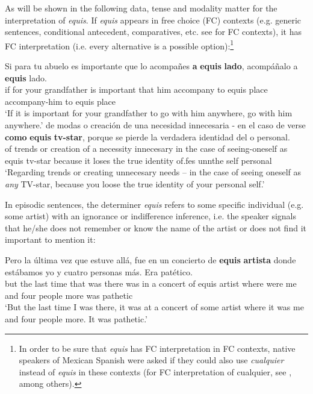 \documentclass[output=paper]{langsci/langscibook}
\begin{document}
As will be shown in the following data, tense and modality matter for the interpretation of \textit{equis}. If \textit{equis} appears in free choice (FC) contexts (e.g. generic sentences, conditional antecedent, comparatives, etc. see \citealt{Aloni2010} for FC contexts), it has FC interpretation (i.e. every alternative is a possible option):\footnote{In order to be sure that \textit{equis} has FC interpretation in FC contexts, native speakers of Mexican Spanish were asked if they could also use \textit{cualquier} instead of \textit{equis} in these contexts (for FC interpretation of cualquier, see \citealt{AM2011}, among others).}

\ea\label{ex:kellert:9}
\gll Si para tu abuelo es importante que lo acompañes \textbf{a} \textbf{equis} \textbf{lado}, acompáñalo a \textbf{equis} lado.\\
if for your grandfather is important that him accompany to equis place accompany-him to equis place\\
\glt ‘If it is important for your grandfather to go with him anywhere, go with him anywhere.’
\ex 
\gll de modas o creación de una necesidad innecesaria - en el caso de verse \textbf{como} \textbf{equis} \textbf{tv-star}, porque se pierde la verdadera identidad del o personal.\\
of trends or creation of a necessity innecesary {} in the case of seeing-oneself as equis tv-star because it	loses the true identity of.fes unnthe self personal\\
\glt ‘Regarding trends or creating unnecesary needs – in the case of seeing oneself as \textit{any} TV-star, because you loose the true identity of your personal self.’
\z

In episodic sentences, the determiner \textit{equis} refers to some specific individual (e.g. some artist) with an ignorance or indifference inference, i.e. the speaker signals that he/she does not remember or know the name of the artist or does not find it important to mention it:

\ea\label{ex:kellert:11}
\gll  Pero la última vez que estuve allá, fue en un concierto de \textbf{equis} \textbf{artista} donde estábamos yo y cuatro personas más. Era patético.\\
but the last time that was there was in a concert of equis artist where were me and four people more was pathetic
\\
\glt ‘But the last time I was there, it was at a concert of some artist where it was me and four people more. It was pathetic.’
\z
\end{document}
